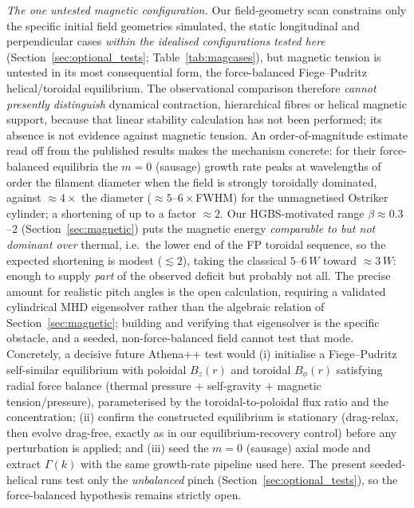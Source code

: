 \documentclass[usenatbib,twoside,twocolumn]{mnras}
\begin{document}
\emph{The one untested magnetic configuration.} Our field-geometry scan constrains only the specific initial field geometries simulated, the static longitudinal and perpendicular cases \emph{within the idealised configurations tested here} (Section~\ref{sec:optional_tests}; Table~\ref{tab:magcases}), but magnetic tension is untested in its most consequential form, the force-balanced Fiege--Pudritz helical/toroidal equilibrium. The observational comparison therefore \emph{cannot presently distinguish} dynamical contraction, hierarchical fibres or helical magnetic support, because that linear stability calculation has not been performed; its absence is not evidence against magnetic tension. An order-of-magnitude estimate read off from the published \citet{Fiege2000} results makes the mechanism concrete: for their force-balanced equilibria the $m=0$ (sausage) growth rate peaks at wavelengths of order the filament diameter when the field is strongly toroidally dominated, against $\approx4\times$ the diameter ($\approx5$--$6\times$FWHM) for the unmagnetised Ostriker cylinder; a shortening of up to a factor $\approx2$. Our HGBS-motivated range $\beta\approx0.3$--$2$ (Section~\ref{sec:magnetic}) puts the magnetic energy \emph{comparable to but not dominant over} thermal, i.e.\ the lower end of the FP toroidal sequence, so the expected shortening is modest ($\lesssim2$), taking the classical $5$--$6\,W$ toward $\approx3\,W$: enough to supply \emph{part} of the observed deficit but probably not all. The precise amount for realistic pitch angles is the open calculation, requiring a validated cylindrical MHD eigensolver rather than the algebraic relation of Section~\ref{sec:magnetic}; building and verifying that eigensolver is the specific obstacle, and a seeded, non-force-balanced field cannot test that mode. Concretely, a decisive future Athena++ test would (i) initialise a Fiege--Pudritz self-similar equilibrium with poloidal $B_z(r)$ and toroidal $B_\phi(r)$ satisfying radial force balance (thermal pressure $+$ self-gravity $+$ magnetic tension/pressure), parameterised by the toroidal-to-poloidal flux ratio and the concentration; (ii) confirm the constructed equilibrium is stationary (drag-relax, then evolve drag-free, exactly as in our equilibrium-recovery control) before any perturbation is applied; and (iii) seed the $m=0$ (sausage) axial mode and extract $\Gamma(k)$ with the same growth-rate pipeline used here. The present seeded-helical runs test only the \emph{unbalanced} pinch (Section~\ref{sec:optional_tests}), so the force-balanced hypothesis remains strictly open.
\end{document}
